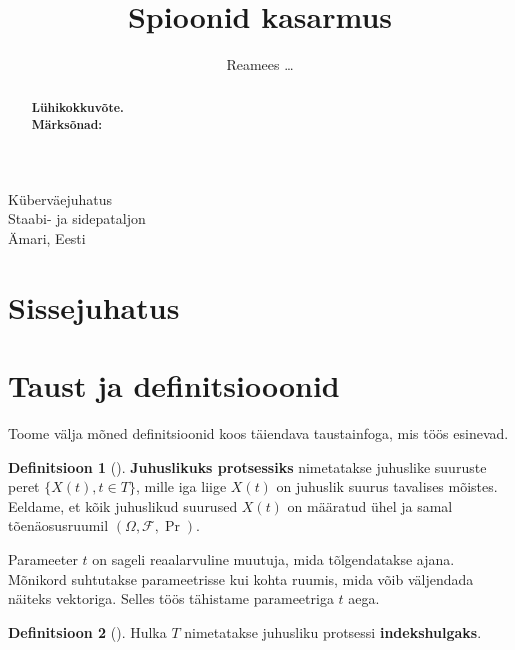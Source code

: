 \documentclass{article}
\theoremstyle{definition}
\newtheorem{definition}{Definitsioon}
\begin{document}
\title{Spioonid kasarmus}
\author{Reamees \dots}
\date{} %

\maketitle
\vspace*{-8mm}

\begin{center}
    {\small Küberväejuhatus \\
    Staabi- ja sidepataljon \\
    Ämari, Eesti}
\end{center}

\begin{abstract}
    \textbf{Lühikokkuvõte.} \\
    \textbf{Märksõnad:}
\end{abstract}

\section{Sissejuhatus}


\section{Taust ja definitsiooonid}

Toome välja mõned definitsioonid koos täiendava taustainfoga, mis töös esinevad.

\begin{definition}[\cite{juhuslikud-protsessid}]
    \textbf{Juhuslikuks protsessiks} nimetatakse juhuslike suuruste peret $\{ X(t) , t \in T \}$, mille iga liige $X(t)$ on juhuslik suurus tavalises mõistes. Eeldame, et kõik juhuslikud suurused $X(t)$ on määratud ühel ja samal tõenäosusruumil $(\Omega, \mathcal{F}, \Pr)$.
\end{definition}

Parameeter $t$ on sageli reaalarvuline muutuja, mida tõlgendatakse ajana. Mõnikord suhtutakse parameetrisse kui kohta ruumis, mida võib väljendada näiteks vektoriga. Selles töös tähistame parameetriga $t$ aega.

\begin{definition}[\cite{juhuslikud-protsessid}]
    Hulka $T$ nimetatakse juhusliku protsessi \textbf{indekshulgaks}.
\end{definition}
\end{document}
